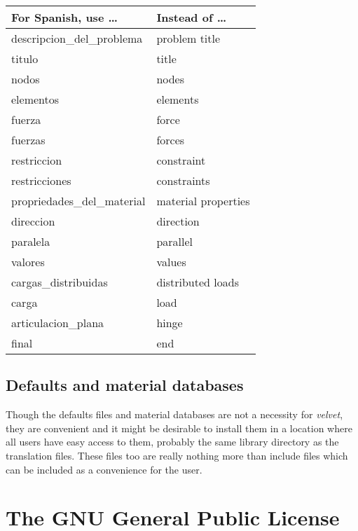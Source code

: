 \begin{appendix}
{\small
\begin{center}
\begin{tabular}{p{3in}p{3in}} \hline
\bf For Spanish, use \dots	& \bf Instead of \dots \\
\hline 
descripcion\_del\_problema 	& problem title \\
titulo 				& title \\
nodos 				& nodes \\
elementos 			& elements \\
fuerza 				& force \\
fuerzas				& forces \\
restriccion 			& constraint \\
restricciones 			& constraints \\
propriedades\_del\_material     & material properties \\
direccion 			& direction \\
paralela 			& parallel \\
valores 			& values \\
cargas\_distribuidas 		& distributed loads \\
carga 				& load \\
articulacion\_plana 		& hinge \\
final 				& end \\
\end{tabular}
\end{center}}

\section{Defaults and material databases}

Though the defaults files and material databases are not a necessity for 
{\em velvet}, they are convenient and it might be desirable to install them in 
a location where all users have easy access to them, probably the same
library directory as the translation files.  These files too are really
nothing more than include files which can be included as a convenience for
the user.



\newpage{\pagestyle{empty}\cleardoublepage}

\chapter{The GNU General Public License}
\label{appendix.gnu-license}



\end{appendix}

